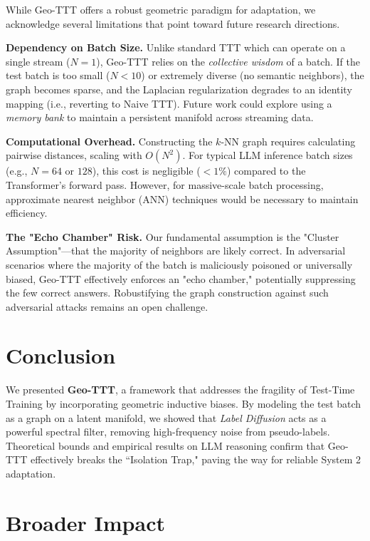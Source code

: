 \documentclass{article}
\theoremstyle{plain}
\theoremstyle{definition}
\theoremstyle{remark}
\begin{document}
While Geo-TTT offers a robust geometric paradigm for adaptation, we acknowledge several limitations that point toward future research directions.

\textbf{Dependency on Batch Size.} 
Unlike standard TTT which can operate on a single stream ($N=1$), Geo-TTT relies on the \textit{collective wisdom} of a batch. If the test batch is too small ($N < 10$) or extremely diverse (no semantic neighbors), the graph becomes sparse, and the Laplacian regularization degrades to an identity mapping (i.e., reverting to Naive TTT). Future work could explore using a \textit{memory bank} to maintain a persistent manifold across streaming data.

\textbf{Computational Overhead.} 
Constructing the $k$-NN graph requires calculating pairwise distances, scaling with $O(N^2)$. For typical LLM inference batch sizes (e.g., $N=64$ or $128$), this cost is negligible ($<1\%$) compared to the Transformer's forward pass. However, for massive-scale batch processing, approximate nearest neighbor (ANN) techniques would be necessary to maintain efficiency.

\textbf{The "Echo Chamber" Risk.} 
Our fundamental assumption is the "Cluster Assumption"—that the majority of neighbors are likely correct. In adversarial scenarios where the majority of the batch is maliciously poisoned or universally biased, Geo-TTT effectively enforces an "echo chamber," potentially suppressing the few correct answers. Robustifying the graph construction against such adversarial attacks remains an open challenge.


\section{Conclusion}
\label{sec:conclusion}

We presented \textbf{Geo-TTT}, a framework that addresses the fragility of Test-Time Training by incorporating geometric inductive biases. By modeling the test batch as a graph on a latent manifold, we showed that \textit{Label Diffusion} acts as a powerful spectral filter, removing high-frequency noise from pseudo-labels. Theoretical bounds and empirical results on LLM reasoning confirm that Geo-TTT effectively breaks the ``Isolation Trap," paving the way for reliable System 2 adaptation.


\section*{Broader Impact}
\end{document}
